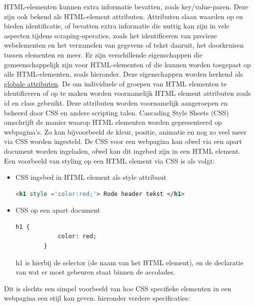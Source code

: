 HTML-elementen kunnen extra informatie bevatten, zoals key/value-paren. Deze zijn ook bekend als HTML-element attributen. Attributen slaan waarden op en bieden identificatie, of bevatten extra informatie die nuttig kan zijn in vele aspecten tijdens scraping-operaties, zoals het identificeren van precieze webelementen en het verzamelen van gegevens of tekst daaruit, het doorkruisen tussen elementen en meer.
Er zijn verschillende eigenschappen die gemeenschappelijk zijn voor HTML-elementen of die kunnen worden toegepast op alle HTML-elementen, zoals hieronder. Deze eigenschappen worden herkend als \href{https://developer.mozilla.org/en-US/docs/Web/HTML/Global attributen}{globale attributen}.
De om individuele of groepen van HTML elementen te identificeren of op te maken worden voornamelijk HTML element attributen zoals id en class gebruikt. Deze attributen worden voornamelijk aangeroepen en beheerd door CSS en andere scripting talen. Cascading Style Sheets (CSS) omschrijft de manier waarop HTML elementen worden gepresenteerd op webpagina's. Zo kan bijvoorbeeld de kleur, positie, animatie en nog zo veel meer via CSS worden ingesteld. De CSS voor een webpagina kan ofwel via een apart document worden ingeladen, ofwel kan dit ingebed zijn in een HTML element.
Een voorbeeld van styling op een HTML element via CSS is als volgt:
\begin{itemize}
	\item CSS ingebed in HTML element als style attribuut
	\begin{lstlisting}[language=HTML]
		<h1 style ='color:red;'> Rode header tekst </h1>
	\end{lstlisting}
	\item CSS op een apart document
	\begin{lstlisting}[language=HTML]
		h1 {
			color: red;
		}
	\end{lstlisting}
	h1 is hierbij de selector (de naam van het HTML element), en de declaratie van wat er moet gebeuren staat binnen de accolades.
\end{itemize}
Dit is slechts een simpel voorbeeld van hoe CSS specifieke elementen in een webpagina een stijl kan geven.
hieronder verdere specificaties:
